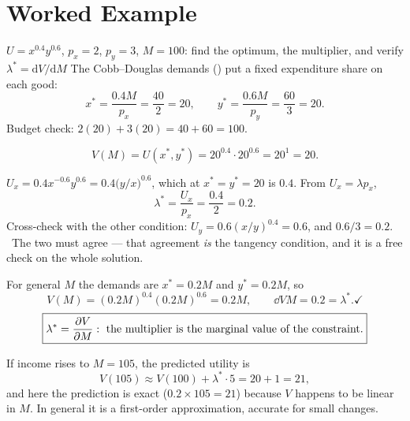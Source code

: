 \section{Worked Example}

\begin{worked}{$U=x^{0.4}y^{0.6}$, $p_{x}=2$, $p_{y}=3$, $M=100$: find the optimum, the multiplier, and verify $\lambda^{*}=\mathrm{d}V/\mathrm{d}M$}
The Cobb--Douglas demands () put a fixed expenditure share on each
good:
\[
  x^{*}=\frac{0.4M}{p_{x}}=\frac{40}{2}=20,
  \qquad
  y^{*}=\frac{0.6M}{p_{y}}=\frac{60}{3}=20 .
\]
Budget check: $2(20)+3(20)=40+60=100$. \checkmark

\[
  V(M)=U(x^{*},y^{*})=20^{0.4}\cdot20^{0.6}=20^{1}=20 .
\]

$U_{x}=0.4x^{-0.6}y^{0.6}=0.4\bigl(y/x\bigr)^{0.6}$, which at
$x^{*}=y^{*}=20$ is $0.4$. From $U_{x}=\lambda p_{x}$,
\[
  \lambda^{*}=\frac{U_{x}}{p_{x}}=\frac{0.4}{2}=0.2 .
\]
Cross-check with the other condition: $U_{y}=0.6(x/y)^{0.4}=0.6$, and
$0.6/3=0.2$. \checkmark\ The two must agree --- that agreement \emph{is} the
tangency condition, and it is a free check on the whole solution.

For general $M$ the demands are $x^{*}=0.2M$ and $y^{*}=0.2M$, so
\[
  V(M)=(0.2M)^{0.4}(0.2M)^{0.6}=0.2M ,
  \qquad
  \dd{V}{M}=0.2=\lambda^{*} . \checkmark
\]
\[
  \boxed{\lambda^{*}=\frac{\partial V}{\partial M}:\ \text{the multiplier is the marginal value of the constraint.}}
\]

If income rises to $M=105$, the predicted utility is
\[
  V(105)\approx V(100)+\lambda^{*}\cdot5=20+1=21 ,
\]
and here the prediction is exact ($0.2\times105=21$) because $V$ happens to
be linear in $M$. In general it is a first-order approximation, accurate for
small changes.


\end{worked}

